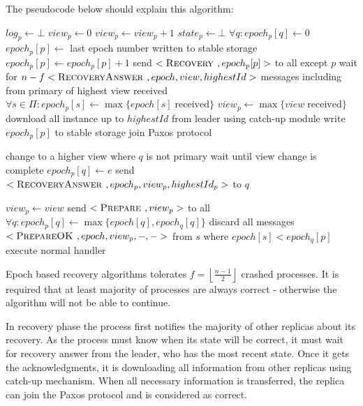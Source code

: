 The pseudocode below should explain this algorithm:
\begin{algorithmic}[1]
  \INIT{}
    \STATE $log_p \leftarrow \bot$ %
    \STATE $view_p \leftarrow 0$
      \STATE $view_p \leftarrow view_p + 1$
    \ENDIF
    \STATE $state_p \leftarrow \bot$ %
    \STATE $\forall q : epoch_p[q] \leftarrow 0$
    \STATE
      \STATE $epoch_p[p] \leftarrow$ last epoch number written to stable storage
      \STATE $epoch_p[p] \leftarrow epoch_p[p] + 1$
      \STATE send $<\textsc{Recovery }, epoch_p[p]>$ to all except $p$
      \STATE wait for $n-f <\textsc{RecoveryAnswer }, epoch, view, highestId>$ messages including from primary of highest view received
      \STATE $\forall s \in \Pi : epoch_p[s] \leftarrow \max\{{epoch[s] \; \mathrm{ received}}\}$
      \STATE $view_p \leftarrow \max\{{ view \; \mathrm{received}}\}$
      \STATE download all instance up to $highestId$ from leader using catch-up module
    \ENDIF
      \STATE write $epoch_p[p]$ to stable storage
    \STATE
    \STATE join Paxos protocol
  \ENDINIT

  \vspace{1em}
      \STATE change to a higher view where $q$ is not primary
      \STATE wait until view change is complete
    \ENDIF
    \STATE $epoch_p[q] \leftarrow e$
    \STATE send $<\textsc{RecoveryAnswer }, epoch_p, view_p, highestId_p>$ to $q$
  \ENDUPON

  \vspace{1em}
      \STATE $view_p \leftarrow view$
      \STATE send $<\textsc{Prepare }, view_p>$ to all
    \ELSE
      \STATE $\forall q : epoch_p[q] \leftarrow \max\{{epoch[q], epoch_q[q]}\}$
        \STATE discard all messages $<\textsc{PrepareOK }, epoch, view_p, -, ->$ from $s$ where $epoch[s] < epoch_q[p]$
      \ENDFOR
      \STATE execute normal handler 
    \ENDIF
  \ENDUPON
\end{algorithmic}

Epoch based recovery algorithms tolerates $f = \left\lfloor \frac{n-1}{2} \right\rfloor $ crashed processes. It is required that at least majority of processes are always correct - otherwise the algorithm will not be able to continue.

In recovery phase the process first notifies the majority of other replicas about its recovery. As the process must know when its state will be correct, it must wait for recovery answer from the leader, who has the most recent state. Once it gets the acknowledgments, it is downloading all information from other replicas using catch-up mechanism.  When all necessary information is transferred, the replica can join the Paxos protocol and is considered as correct.

